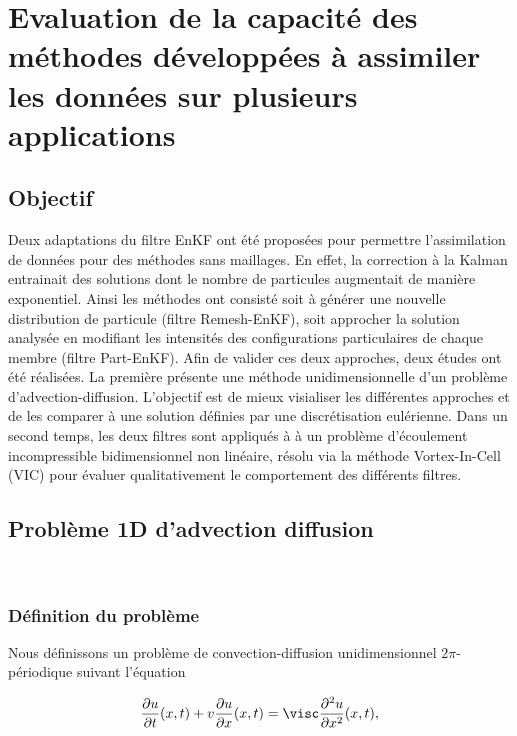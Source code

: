 \chapter{Evaluation de la capacité des méthodes développées à assimiler les données sur plusieurs applications}
\newcommand{\xx}{x_0 = 0.02}
\newcommand{\sigx}{\sigma_0^2 = 0.5}
\newcommand{\npart}{$N_{part} = 100$}
\newcommand{\ngrid}{$N_{grid} = 100$}
\newcommand{\sigmaY}{0.05}

\section{Objectif}

Deux adaptations du filtre EnKF ont été proposées pour permettre l'assimilation de données pour des méthodes sans maillages. En effet, la correction à la Kalman entrainait des solutions dont le nombre de particules augmentait de manière exponentiel. Ainsi les méthodes ont consisté soit à générer une nouvelle distribution de particule (filtre Remesh-EnKF), soit approcher la solution analysée en modifiant les intensités des configurations particulaires de chaque membre (filtre Part-EnKF). Afin de valider ces deux approches, deux études ont été réalisées. La première présente une méthode unidimensionnelle d'un problème d'advection-diffusion. L'objectif est de mieux visialiser les différentes approches et de les comparer à une solution définies par une discrétisation eulérienne. Dans un second temps, les deux filtres sont appliqués à à un problème d'écoulement incompressible bidimensionnel non linéaire, résolu via la méthode Vortex-In-Cell (VIC) pour évaluer qualitativement le comportement des différents filtres.

\section{Problème 1D d'advection diffusion}~\label{sec:App_1D}

\subsection{Définition du problème}
Nous définissons un problème de convection-diffusion unidimensionnel $2\pi$-périodique suivant l'équation

\begin{equation*}
    \frac{\partial u}{\partial t}(x,t) + v \frac{\partial u}{\partial x}(x,t) = \visc \frac{\partial^2 u}{\partial x^2}(x,t),
\end{equation*}

